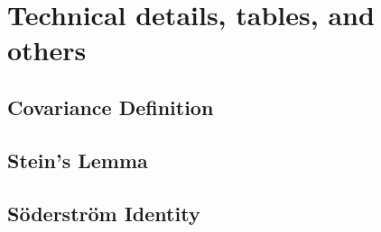 
\chapter{Technical details, tables, and others}
\label{app_a}

\section{Covariance Definition}
\label{app: cov-def}

\section{Stein's Lemma}
\label{app: steins lemma}

\section{S\"{o}derstr\"{o}m Identity}
\label{app: sod-id}